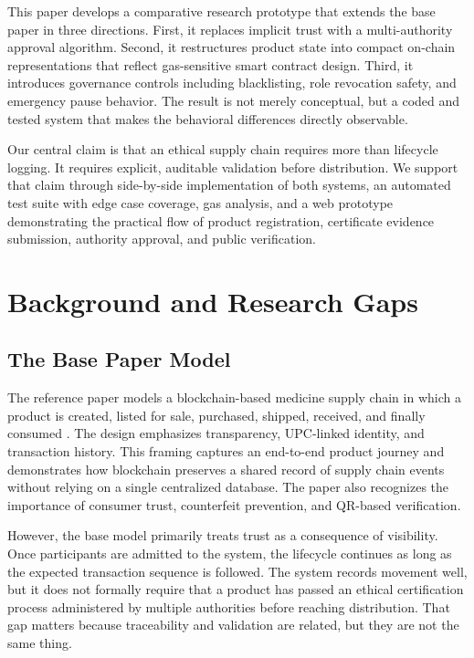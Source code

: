 \documentclass[conference]{IEEEtran}
\begin{document}
This paper develops a comparative research prototype that extends the base paper in three directions. First, it replaces implicit trust with a multi-authority approval algorithm. Second, it restructures product state into compact on-chain representations that reflect gas-sensitive smart contract design. Third, it introduces governance controls including blacklisting, role revocation safety, and emergency pause behavior. The result is not merely conceptual, but a coded and tested system that makes the behavioral differences directly observable.

Our central claim is that an ethical supply chain requires more than lifecycle logging. It requires explicit, auditable validation before distribution. We support that claim through side-by-side implementation of both systems, an automated test suite with edge case coverage, gas analysis, and a web prototype demonstrating the practical flow of product registration, certificate evidence submission, authority approval, and public verification.

\section{Background and Research Gaps}

\subsection{The Base Paper Model}

The reference paper models a blockchain-based medicine supply chain in which a product is created, listed for sale, purchased, shipped, received, and finally consumed \cite{latif2025}. The design emphasizes transparency, UPC-linked identity, and transaction history. This framing captures an end-to-end product journey and demonstrates how blockchain preserves a shared record of supply chain events without relying on a single centralized database. The paper also recognizes the importance of consumer trust, counterfeit prevention, and QR-based verification.

However, the base model primarily treats trust as a consequence of visibility. Once participants are admitted to the system, the lifecycle continues as long as the expected transaction sequence is followed. The system records movement well, but it does not formally require that a product has passed an ethical certification process administered by multiple authorities before reaching distribution. That gap matters because traceability and validation are related, but they are not the same thing.
\end{document}
